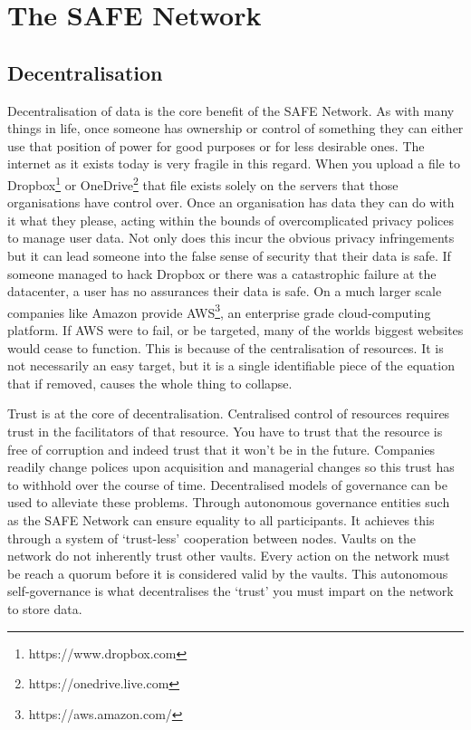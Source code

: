 \chapter{The SAFE Network}
\label{ch:thesafenetwork}

\section{Decentralisation}

Decentralisation of data is the core benefit of the SAFE Network. As with many things in life, once someone has ownership or control of something they can either use that position of power for good purposes or for less desirable ones. The internet as it exists today is very fragile in this regard. When you upload a file to Dropbox\footnote{https://www.dropbox.com} or OneDrive\footnote{https://onedrive.live.com} that file exists solely on the servers that those organisations have control over. Once an organisation has data they can do with it what they please, acting within the bounds of overcomplicated privacy polices to manage user data. Not only does this incur the obvious privacy infringements but it can lead someone into the false sense of security that their data is safe. If someone managed to hack Dropbox or there was a catastrophic failure at the datacenter, a user has no assurances their data is safe. On a much larger scale companies like Amazon provide AWS\footnote{https://aws.amazon.com/}, an enterprise grade cloud-computing platform. If AWS were to fail, or be targeted, many of the worlds biggest websites would cease to function. This is because of the centralisation of resources. It is not necessarily an easy target, but it is a single identifiable piece of the equation that if removed, causes the whole thing to collapse.

Trust is at the core of decentralisation. Centralised control of resources requires trust in the facilitators of that resource. You have to trust that the resource is free of corruption and indeed trust that it won't be in the future. Companies readily change polices upon acquisition and managerial changes so this trust has to withhold over the course of time. Decentralised models of governance can be used to alleviate these problems. Through autonomous governance entities such as the SAFE Network can ensure equality to all participants. It achieves this through a system of `trust-less' cooperation between nodes. Vaults on the network do not inherently trust other vaults. Every action on the network must be reach a quorum before it is considered valid by the vaults. This autonomous self-governance is what decentralises the `trust' you must impart on the network to store data.

